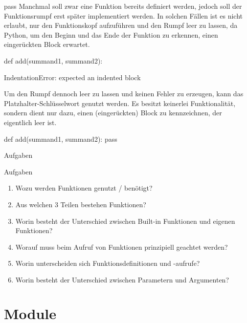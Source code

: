     
    \begin{frame}[fragile]{pass}
        Manchmal soll zwar eine Funktion bereits definiert werden, jedoch soll der Funktionsrumpf erst später implementiert werden. In solchen Fällen ist es nicht erlaubt, nur den Funktionskopf aufzuführen und den Rumpf leer zu lassen, da Python, um den Beginn und das Ende der Funktion zu erkennen, einen eingerückten Block erwartet.
        
\begin{pythoncode}
def add(summand1, summand2):

IndentationError: expected an indented block
\end{pythoncode}

        Um den Rumpf dennoch leer zu lassen und keinen Fehler zu erzeugen, kann das Platzhalter-Schlüsselwort  genutzt werden. Es besitzt keinerlei Funktionalität, sondern dient nur dazu, einen (eingerückten) Block zu kennzeichnen, der eigentlich leer ist.

        
\begin{pythoncode}
def add(summand1, summand2):
    pass
\end{pythoncode}
    \end{frame}
    
    \begin{subsection}{Aufgaben}
        \begin{frame}{Aufgaben}
            \begin{enumerate}
                \item Wozu werden Funktionen genutzt / benötigt?
                \item Aus welchen 3 Teilen bestehen Funktionen?
                \item Worin besteht der Unterschied zwischen Built-in Funktionen und eigenen Funktionen?
                \item Worauf muss beim Aufruf von Funktionen prinzipiell geachtet werden?
                \item Worin unterscheiden sich Funktionsdefinitionen und -aufrufe?
                \item Worin besteht der Unterschied zwischen Parametern und Argumenten?
            \end{enumerate}
        \end{frame}
    \end{subsection}
    
\section{Module}
    \label{subs:modules}
    
